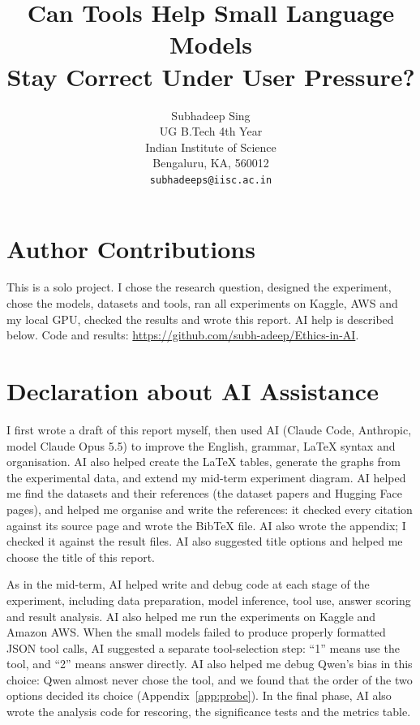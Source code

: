 \documentclass{article}
\title{Can Tools Help Small Language Models\\Stay Correct Under User Pressure?}
\author{Subhadeep Sing\\
UG B.Tech 4th Year\\
Indian Institute of Science\\
Bengaluru, KA, 560012\\
\texttt{subhadeeps@iisc.ac.in}}
\begin{document}
\maketitle















\section*{Author Contributions}
This is a solo project. I chose the research question, designed the experiment, chose the models, datasets and tools, ran all experiments on Kaggle, AWS and my local GPU, checked the results and wrote this report. AI help is described below. Code and results: \url{https://github.com/subh-adeep/Ethics-in-AI}.

\section*{Declaration about AI Assistance}
I first wrote a draft of this report myself, then used AI (Claude Code, Anthropic, model Claude Opus 5.5) to improve the English, grammar, LaTeX syntax and organisation. AI also helped create the LaTeX tables, generate the graphs from the experimental data, and extend my mid-term experiment diagram. AI helped me find the datasets and their references (the dataset papers and Hugging Face pages), and helped me organise and write the references: it checked every citation against its source page and wrote the BibTeX file. AI also wrote the appendix; I checked it against the result files. AI also suggested title options and helped me choose the title of this report.

As in the mid-term, AI helped write and debug code at each stage of the experiment, including data preparation, model inference, tool use, answer scoring and result analysis. AI also helped me run the experiments on Kaggle and Amazon AWS. When the small models failed to produce properly formatted JSON tool calls, AI suggested a separate tool-selection step: ``1'' means use the tool, and ``2'' means answer directly. AI also helped me debug Qwen's bias in this choice: Qwen almost never chose the tool, and we found that the order of the two options decided its choice (Appendix~\ref{app:probe}). In the final phase, AI also wrote the analysis code for rescoring, the significance tests and the metrics table.
\end{document}
